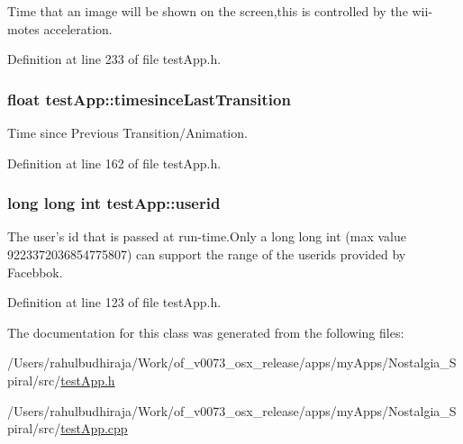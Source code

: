 Time that an image will be shown on the screen,this is controlled by the wii-\/motes acceleration. 



Definition at line 233 of file test\-App.\-h.

\hypertarget{classtest_app_acb60fb8a89e9ec5d461630a20b11ceda}{
\subsubsection[{timesince\-Last\-Transition}]{\setlength{\rightskip}{0pt plus 5cm}float test\-App\-::timesince\-Last\-Transition}}\label{classtest_app_acb60fb8a89e9ec5d461630a20b11ceda}


Time since Previous Transition/\-Animation. 



Definition at line 162 of file test\-App.\-h.

\hypertarget{classtest_app_a6ae76dc97fbeee00755f4a6cd6b87e19}{
\subsubsection[{userid}]{\setlength{\rightskip}{0pt plus 5cm}long long int test\-App\-::userid}}\label{classtest_app_a6ae76dc97fbeee00755f4a6cd6b87e19}


The user's id that is passed at run-\/time.\-Only a long long int (max value 9223372036854775807) can support the range of the userids provided by Facebbok. 



Definition at line 123 of file test\-App.\-h.



The documentation for this class was generated from the following files\-:\begin{DoxyCompactItemize}
\item 
/\-Users/rahulbudhiraja/\-Work/of\-\_\-v0073\-\_\-osx\-\_\-release/apps/my\-Apps/\-Nostalgia\-\_\-\-Spiral/src/\hyperlink{test_app_8h}{test\-App.\-h}\item 
/\-Users/rahulbudhiraja/\-Work/of\-\_\-v0073\-\_\-osx\-\_\-release/apps/my\-Apps/\-Nostalgia\-\_\-\-Spiral/src/\hyperlink{test_app_8cpp}{test\-App.\-cpp}\end{DoxyCompactItemize}
